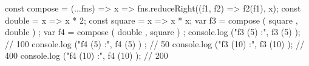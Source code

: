 const compose = (...fns) => x => fns.reduceRight((f1, f2) => f2(f1), x); 
const double = x => x * 2;
const square = x => x * x;
var f3 = compose ( square , double ) ;
var f4 = compose ( double , square ) ;
console.log ("f3 (5) :", f3 (5) ); // 100
console.log ("f4 (5) :", f4 (5) ) ; // 50
console.log ("f3 (10) :", f3 (10) ); // 400
console.log ("f4 (10) :", f4 (10) ); // 200